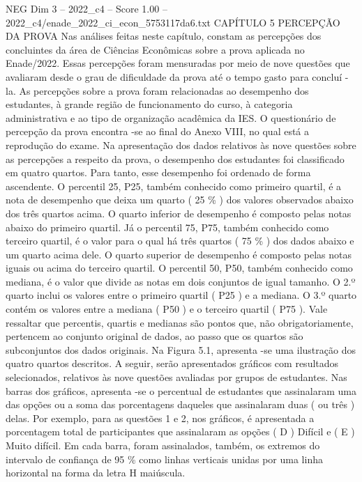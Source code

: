 \begin{textsample}{NEG Dim 3 – 2022\_c4 – Score 1.00 – 2022\_c4/enade\_2022\_ci\_econ\_5753117da6.txt}  \label{ex:f3_neg_145}
CAPÍTULO 5 PERCEPÇÃO DA PROVA Nas análises feitas neste capítulo, constam as percepções dos concluintes da área de Ciências Econômicas sobre a prova aplicada no Enade/2022.
Essas percepções foram mensuradas por meio de nove questões que avaliaram desde o grau de dificuldade da prova até o tempo gasto para concluí -la.
As percepções sobre a prova foram relacionadas ao desempenho dos estudantes, à grande região de funcionamento do curso, à categoria administrativa e ao tipo de organização acadêmica da IES.
O questionário de percepção da prova encontra -se ao final do Anexo VIII, no qual está a reprodução do exame.
Na apresentação dos dados relativos às nove questões sobre as percepções a respeito da prova, o desempenho dos estudantes foi classificado em quatro quartos.
Para tanto, esse desempenho foi ordenado de forma ascendente.
O percentil 25, P25, também conhecido como primeiro quartil, é a nota de desempenho que deixa um quarto ( 25 \% ) dos valores observados abaixo dos três quartos acima.
O quarto inferior de desempenho é composto pelas notas abaixo do primeiro quartil.
Já o percentil 75, P75, também conhecido como terceiro quartil, é o valor para o qual há três quartos ( 75 \% ) dos dados abaixo e um quarto acima dele.
O quarto superior de desempenho é composto pelas notas iguais ou acima do terceiro quartil.
O percentil 50, P50, também conhecido como mediana, é o valor que divide as notas em dois conjuntos de igual tamanho.
O 2.º quarto inclui os valores entre o primeiro quartil ( P25 ) e a mediana.
O 3.º quarto contém os valores entre a mediana ( P50 ) e o terceiro quartil ( P75 ).
Vale ressaltar que percentis, quartis e medianas são pontos que, não obrigatoriamente, pertencem ao conjunto original de dados, ao passo que os quartos são subconjuntos dos dados originais.
Na Figura 5.1, apresenta -se uma ilustração dos quatro quartos descritos.
A seguir, serão apresentados gráficos com resultados selecionados, relativos às nove questões avaliadas por grupos de estudantes.
Nas barras dos gráficos, apresenta -se o percentual de estudantes que assinalaram uma das opções ou a soma das porcentagens daqueles que assinalaram duas ( ou três ) delas.
Por exemplo, para as questões 1 e 2, nos gráficos, é apresentada a porcentagem total de participantes que assinalaram as opções ( D ) Difícil e ( E ) Muito difícil.
Em cada barra, foram assinalados, também, os extremos do intervalo de confiança de 95 \% como linhas verticais unidas por uma linha horizontal na forma da letra H maiúscula.

\end{textsample}
